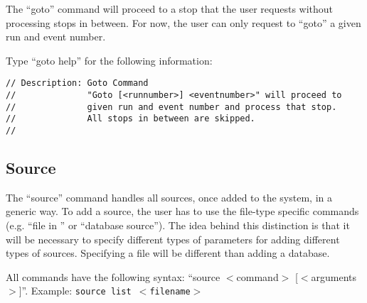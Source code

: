 \documentclass[12pt]{article}
\begin{document}
The ``goto'' command will proceed to a stop that the user requests
without processing stops in between. For now, the user can only request
to ``goto'' a given run and event number.

Type ``goto help'' for the following information:
%
\begin{verbatim}
// Description: Goto Command
//              "Goto [<runnumber>] <eventnumber>" will proceed to
//              given run and event number and process that stop.
//              All stops in between are skipped.
//
\end{verbatim}


\subsection{Source }
\label{sec:SourceCommand}

The ``source'' command handles all sources, once added to the system, in
a generic way.  To add a source, the user has to use the file-type
specific commands (e.g. ``file in '' or ``database source'').
The idea behind this distinction is that it will be necessary to specify
different types of parameters for adding different types of
sources. Specifying a file will be different than adding a database.

All commands have the following syntax:
\newline ``source $<$command$>$ [$<$arguments$>$]''. 
\newline Example: \texttt{source list $<$filename$>$}
\end{document}
